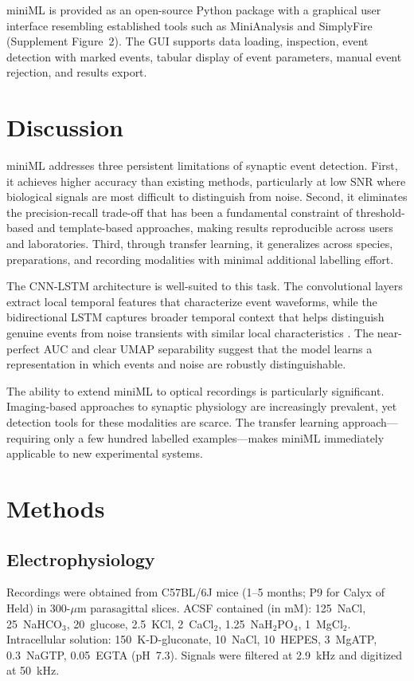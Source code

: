 \documentclass[11pt]{article}
\begin{document}
miniML is provided as an open-source Python package with a graphical user interface resembling established tools such as MiniAnalysis and SimplyFire (Supplement Figure~2). The GUI supports data loading, inspection, event detection with marked events, tabular display of event parameters, manual event rejection, and results export.

\section{Discussion}

miniML addresses three persistent limitations of synaptic event detection. First, it achieves higher accuracy than existing methods, particularly at low SNR where biological signals are most difficult to distinguish from noise. Second, it eliminates the precision-recall trade-off that has been a fundamental constraint of threshold-based and template-based approaches, making results reproducible across users and laboratories. Third, through transfer learning, it generalizes across species, preparations, and recording modalities with minimal additional labelling effort.

The CNN-LSTM architecture is well-suited to this task. The convolutional layers extract local temporal features that characterize event waveforms, while the bidirectional LSTM captures broader temporal context that helps distinguish genuine events from noise transients with similar local characteristics \citep{lecun2015deep}. The near-perfect AUC and clear UMAP separability suggest that the model learns a representation in which events and noise are robustly distinguishable.

The ability to extend miniML to optical recordings is particularly significant. Imaging-based approaches to synaptic physiology are increasingly prevalent, yet detection tools for these modalities are scarce. The transfer learning approach---requiring only a few hundred labelled examples---makes miniML immediately applicable to new experimental systems.

\section{Methods}

\subsection{Electrophysiology}
Recordings were obtained from C57BL/6J mice (1--5 months; P9 for Calyx of Held) in 300-$\mu$m parasagittal slices. ACSF contained (in mM): 125~NaCl, 25~NaHCO$_3$, 20~glucose, 2.5~KCl, 2~CaCl$_2$, 1.25~NaH$_2$PO$_4$, 1~MgCl$_2$. Intracellular solution: 150~K-D-gluconate, 10~NaCl, 10~HEPES, 3~MgATP, 0.3~NaGTP, 0.05~EGTA (pH~7.3). Signals were filtered at 2.9~kHz and digitized at 50~kHz.
\end{document}

